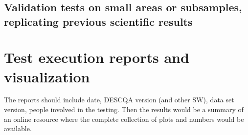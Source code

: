 \documentclass[12pt, a4paper]{article}
\begin{document}
\subsection{Validation tests on small areas or subsamples, replicating previous scientific results}


\section{Test execution reports and visualization}

The reports should include date, DESCQA version (and other SW), data set version, people involved in the testing. Then the results would be a summary of an online resource where the complete collection of plots and numbers would be available.
\end{document}
